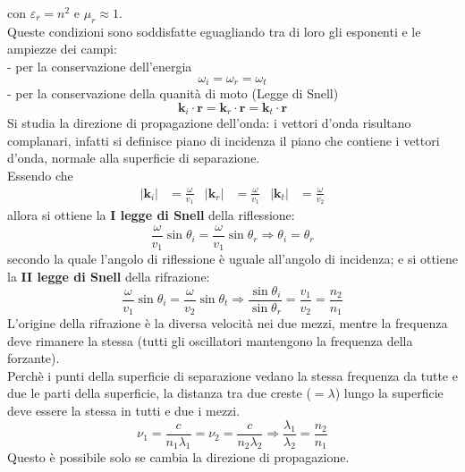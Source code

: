 \documentclass{article}
\begin{document}
con $\varepsilon_r=n^2$ e $\mu_r \approx 1$.\\
Queste condizioni sono soddisfatte eguagliando tra di loro gli esponenti e le ampiezze dei campi:\\
- per la conservazione dell'energia
\begin{equation}
    \omega_i=\omega_r=\omega_t
    \nonumber
\end{equation}
- per la conservazione della quanità di moto (Legge di Snell)
\begin{equation}
    \textbf{k}_i\cdot \textbf{r}=\textbf{k}_r\cdot \textbf{r}=\textbf{k}_t\cdot \textbf{r}
    \nonumber
\end{equation}
Si studia la direzione di propagazione dell'onda: i vettori d'onda risultano complanari, infatti si definisce piano di incidenza il piano che contiene i vettori d'onda, normale alla superficie di separazione.\\
Essendo che 
\begin{align*}
    |\textbf{k}_i|&=\frac{\omega}{v_1} & 
    |\textbf{k}_r|&=\frac{\omega}{v_1} &
    |\textbf{k}_t|&=\frac{\omega}{v_2} 
\end{align*}
allora si ottiene la \textbf{I legge di Snell} della riflessione:
\begin{equation}
    \frac{\omega}{v_1}\sin\theta_i=\frac{\omega}{v_1}\sin\theta_r \Rightarrow \theta_i=\theta_r
    \nonumber
\end{equation}
secondo la quale l’angolo di riflessione è uguale all'angolo di incidenza; e si ottiene la \textbf{II legge di Snell} della rifrazione:
\begin{equation}
    \frac{\omega}{v_1}\sin\theta_i=\frac{\omega}{v_2}\sin\theta_t \Rightarrow \frac{\sin\theta_i}{\sin\theta_r}=\frac{v_1}{v_2}=\frac{n_2}{n_1}
    \nonumber
\end{equation}
L’origine della rifrazione è la diversa velocità nei due mezzi, mentre la frequenza deve rimanere la stessa (tutti gli oscillatori mantengono la frequenza della forzante).\\
Perchè i punti della superficie di separazione vedano la stessa frequenza da tutte e due le parti della superficie, la distanza tra due creste ($=\lambda$) lungo la superficie deve essere la stessa in tutti e due i mezzi.
\begin{equation}
    \nu_1=\frac{c}{n_1\lambda_1}=\nu_2=\frac{c}{n_2\lambda_2} \Rightarrow \frac{\lambda_1}{\lambda_2}=\frac{n_2}{n_1}
    \nonumber
\end{equation}
Questo è possibile solo se cambia la direzione di propagazione.\\
\end{document}
